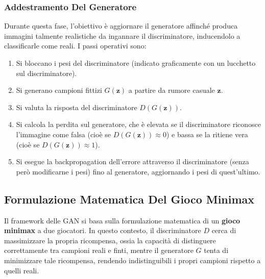 ﻿\documentclass[11pt, a4paper]{article}
\begin{document}

\subsubsection{Addestramento Del Generatore}

Durante questa fase, l'obiettivo è aggiornare il generatore affinché produca immagini talmente realistiche da ingannare il discriminatore, inducendolo a classificarle come reali. I passi operativi sono:
\begin{enumerate}
    \item Si bloccano i pesi del discriminatore (indicato graficamente con un lucchetto sul discriminatore).
    \item Si generano campioni fittizi $G(\bm{z})$ a partire da rumore casuale $\bm{z}$.
    \item Si valuta la risposta del discriminatore $D(G(\bm{z}))$.
    \item Si calcola la perdita sul generatore, che è elevata se il discriminatore riconosce l'immagine come falsa (cioè se $D(G(\bm{z})) \approx 0$) e bassa se la ritiene vera (cioè se $D(G(\bm{z})) \approx 1$).
    \item Si esegue la backpropagation dell'errore attraverso il discriminatore (senza però modificarne i pesi) fino al generatore, aggiornando i pesi di quest'ultimo.
\end{enumerate}


\subsection{Formulazione Matematica Del Gioco Minimax}

Il framework delle GAN si basa sulla formulazione matematica di un \textbf{gioco minimax} a due giocatori. In questo contesto, il discriminatore $D$ cerca di massimizzare la propria ricompensa, ossia la capacità di distinguere correttamente tra campioni reali e finti, mentre il generatore $G$ tenta di minimizzare tale ricompensa, rendendo indistinguibili i propri campioni rispetto a quelli reali.
\end{document}
